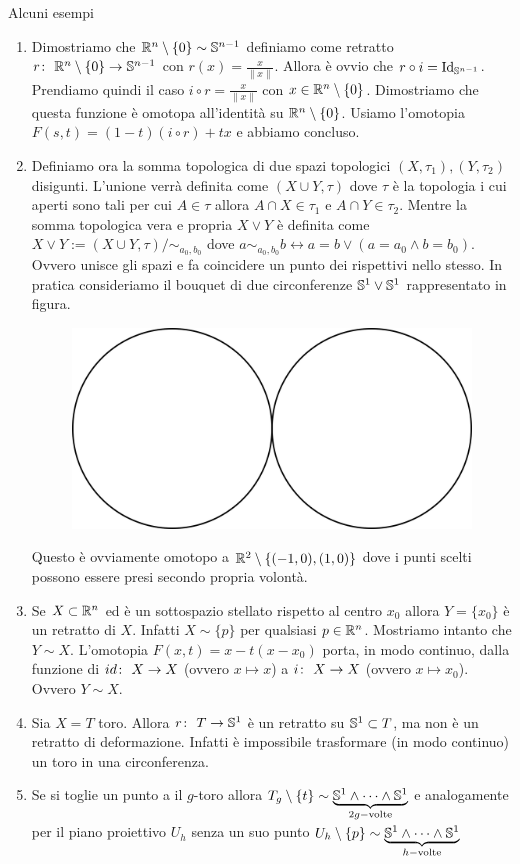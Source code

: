 \begin{remark}
	Alcuni esempi
	\begin{enumerate}
		\item Dimostriamo che $\R^n \setminus \{0\} \sim \S^{n-1}$ definiamo come retratto $\morphism{r}{\R^n \setminus \{0\}}{\S^{n-1}}$ con $r(x) = \frac{x}{\|x\|}$. Allora è ovvio che $r \circ i = \operatorname{Id}_{\S^{n-1}}$. Prendiamo quindi il caso $i \circ r = \frac{x}{\|x\|}$ con $x \in \R^n  \setminus \{0\}$. Dimostriamo che questa funzione è omotopa all'identità su $\R^n \setminus \{0\}$. Usiamo l'omotopia $F(s,t) = (1-t)(i \circ r) + tx$ e abbiamo concluso.
		\item Definiamo ora la somma topologica di due spazi topologici $(X, \tau_1), (Y, \tau_2)$ disigunti. L'unione verrà definita come $(X \cup Y, \tau)$ dove $\tau$ è la topologia i cui aperti sono tali per cui $A \in \tau$ allora $A \cap X \in \tau_1$ e $A \cap Y \in \tau_2$. Mentre la somma topologica vera e propria $X \lor Y$ è definita come $X \lor Y := (X \cup Y, \tau) / \sim_{a_0, b_0}$ dove $ a \sim_{a_0, b_0} b \leftrightarrow a = b \lor (a = a_0 \land b = b_0)$. Ovvero unisce gli spazi e fa coincidere un punto dei rispettivi nello stesso. In pratica consideriamo il bouquet di due circonferenze $\S^1 \lor \S^1$ rappresentato in figura.
		
		\begin{figure}[h]
			\centering
			\includegraphics[width=0.3\linewidth]{images/topologia_algebrica/bouquet_circonferenze}
			\caption{}
			\label{fig:bouquetcirconferenze}
		\end{figure}
		Questo è ovviamente omotopo a $\R^2 \setminus \{(-1,0), (1,0)\}$ dove i punti scelti possono essere presi secondo propria volontà.
		\item Se $X \subset \R^n$ ed è un sottospazio stellato rispetto al centro $x_0$ allora $Y = \{x_0\}$ è un retratto di $X$. Infatti $X \sim \{p\}$ per qualsiasi $p \in \R^n$. Mostriamo intanto che $Y \sim X$. L'omotopia $F(x,t) = x - t(x-x_0)$ porta, in modo continuo, dalla funzione di $\morphism{id}{X}{X}$ (ovvero $x \mapsto x$) a $\morphism{i}{X}{X}$ (ovvero $x \mapsto x_0$). Ovvero $Y \sim X$.
		\item Sia $X = T$ toro. Allora $\morphism{r}{T}{\S^1}$ è un retratto su $\S^1 \subset T$, ma non è un retratto di deformazione. Infatti è impossibile trasformare (in modo continuo) un toro in una circonferenza. 
		\item Se si toglie un punto a il $g$-toro allora $T_g \setminus \{t\} \sim \underbrace{\S^1 \wedge \dots \wedge \S^1}_{2g-\text{volte}}$ e analogamente per il piano proiettivo $U_h$ senza un suo punto $U_h \setminus \{p\} \sim \underbrace{\S^1 \wedge \dots \wedge \S^1}_{h-\text{volte}}$
 	\end{enumerate}
\end{remark}

